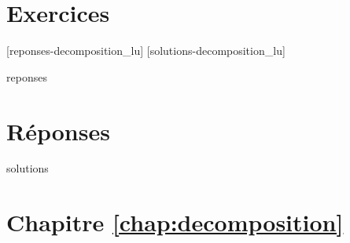 \section{Exercices}
\label{chap:decomposition:exercices}

[reponses-decomposition_lu]
[solutions-decomposition_lu]

\begin{Filesave}{reponses}
\bigskip
\section*{Réponses}

\end{Filesave}

\begin{Filesave}{solutions}
\section*{Chapitre \ref*{chap:decomposition}}

\end{Filesave}

